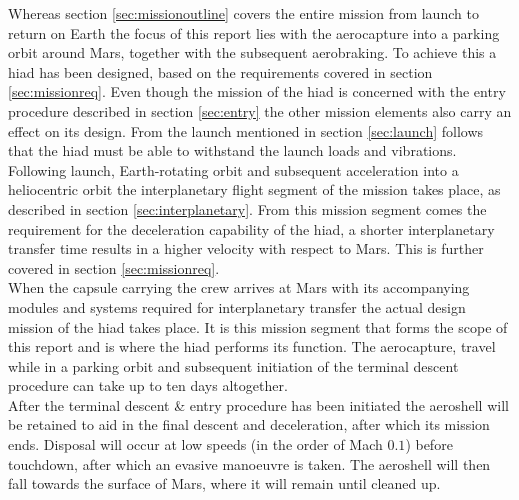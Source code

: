 Whereas section \ref{sec:missionoutline} covers the entire mission from launch to return on Earth the focus of this report lies with the aerocapture into a parking orbit around Mars, together with the subsequent aerobraking. To achieve this a \gls{hiad} has been designed, based on the requirements covered in section \ref{sec:missionreq}. Even though the mission of the \gls{hiad} is concerned with the entry procedure described in section \ref{sec:entry} the other mission elements also carry an effect on its design. From the launch mentioned in section \ref{sec:launch} follows that the \gls{hiad} must be able to withstand the launch loads and vibrations. \\
Following launch, Earth-rotating orbit and subsequent acceleration into a heliocentric orbit the interplanetary flight segment of the mission takes place, as described in section \ref{sec:interplanetary}. From this mission segment comes the requirement for the deceleration capability of the \gls{hiad}, a shorter interplanetary transfer time results in a higher velocity with respect to Mars. This is further covered in section \ref{sec:missionreq}. \\
When the capsule carrying the crew arrives at Mars with its accompanying modules and systems required for interplanetary transfer the actual design mission of the \gls{hiad} takes place. It is this mission segment that forms the scope of this report and is where the \gls{hiad} performs its function. The aerocapture, travel while in a parking orbit and subsequent initiation of the terminal descent procedure can take up to ten days altogether. \\
After the terminal descent \& entry procedure has been initiated the aeroshell will be retained to aid in the final descent and deceleration, after which its mission ends. Disposal will occur at low speeds (in the order of Mach $0.1$) before touchdown, after which an evasive manoeuvre is taken. The aeroshell will then fall towards the surface of Mars, where it will remain until cleaned up.